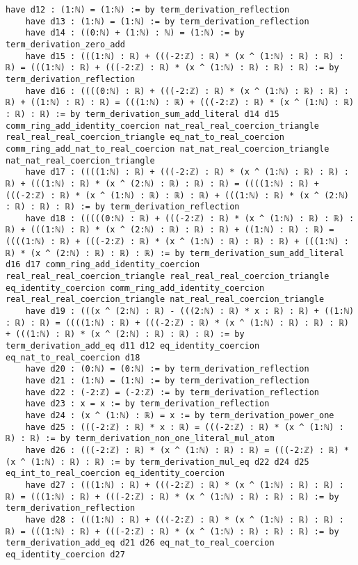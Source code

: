 \documentclass{article}
\begin{document}
\begin{tcolorbox}[colback=white!10, width=\linewidth]
\begin{lstlisting}[language=Lean4]
    have d12 : (1:ℕ) = (1:ℕ) := by term_derivation_reflection
    have d13 : (1:ℕ) = (1:ℕ) := by term_derivation_reflection
    have d14 : ((0:ℕ) + (1:ℕ) : ℕ) = (1:ℕ) := by term_derivation_zero_add
    have d15 : (((1:ℕ) : ℝ) + (((-2:ℤ) : ℝ) * (x ^ (1:ℕ) : ℝ) : ℝ) : ℝ) = (((1:ℕ) : ℝ) + (((-2:ℤ) : ℝ) * (x ^ (1:ℕ) : ℝ) : ℝ) : ℝ) := by term_derivation_reflection
    have d16 : ((((0:ℕ) : ℝ) + (((-2:ℤ) : ℝ) * (x ^ (1:ℕ) : ℝ) : ℝ) : ℝ) + ((1:ℕ) : ℝ) : ℝ) = (((1:ℕ) : ℝ) + (((-2:ℤ) : ℝ) * (x ^ (1:ℕ) : ℝ) : ℝ) : ℝ) := by term_derivation_sum_add_literal d14 d15 comm_ring_add_identity_coercion nat_real_real_coercion_triangle real_real_real_coercion_triangle eq_nat_to_real_coercion comm_ring_add_nat_to_real_coercion nat_nat_real_coercion_triangle nat_nat_real_coercion_triangle
    have d17 : ((((1:ℕ) : ℝ) + (((-2:ℤ) : ℝ) * (x ^ (1:ℕ) : ℝ) : ℝ) : ℝ) + (((1:ℕ) : ℝ) * (x ^ (2:ℕ) : ℝ) : ℝ) : ℝ) = ((((1:ℕ) : ℝ) + (((-2:ℤ) : ℝ) * (x ^ (1:ℕ) : ℝ) : ℝ) : ℝ) + (((1:ℕ) : ℝ) * (x ^ (2:ℕ) : ℝ) : ℝ) : ℝ) := by term_derivation_reflection
    have d18 : (((((0:ℕ) : ℝ) + (((-2:ℤ) : ℝ) * (x ^ (1:ℕ) : ℝ) : ℝ) : ℝ) + (((1:ℕ) : ℝ) * (x ^ (2:ℕ) : ℝ) : ℝ) : ℝ) + ((1:ℕ) : ℝ) : ℝ) = ((((1:ℕ) : ℝ) + (((-2:ℤ) : ℝ) * (x ^ (1:ℕ) : ℝ) : ℝ) : ℝ) + (((1:ℕ) : ℝ) * (x ^ (2:ℕ) : ℝ) : ℝ) : ℝ) := by term_derivation_sum_add_literal d16 d17 comm_ring_add_identity_coercion real_real_real_coercion_triangle real_real_real_coercion_triangle eq_identity_coercion comm_ring_add_identity_coercion real_real_real_coercion_triangle nat_real_real_coercion_triangle
    have d19 : (((x ^ (2:ℕ) : ℝ) - (((2:ℕ) : ℝ) * x : ℝ) : ℝ) + ((1:ℕ) : ℝ) : ℝ) = ((((1:ℕ) : ℝ) + (((-2:ℤ) : ℝ) * (x ^ (1:ℕ) : ℝ) : ℝ) : ℝ) + (((1:ℕ) : ℝ) * (x ^ (2:ℕ) : ℝ) : ℝ) : ℝ) := by term_derivation_add_eq d11 d12 eq_identity_coercion eq_nat_to_real_coercion d18
    have d20 : (0:ℕ) = (0:ℕ) := by term_derivation_reflection
    have d21 : (1:ℕ) = (1:ℕ) := by term_derivation_reflection
    have d22 : (-2:ℤ) = (-2:ℤ) := by term_derivation_reflection
    have d23 : x = x := by term_derivation_reflection
    have d24 : (x ^ (1:ℕ) : ℝ) = x := by term_derivation_power_one
    have d25 : (((-2:ℤ) : ℝ) * x : ℝ) = (((-2:ℤ) : ℝ) * (x ^ (1:ℕ) : ℝ) : ℝ) := by term_derivation_non_one_literal_mul_atom
    have d26 : (((-2:ℤ) : ℝ) * (x ^ (1:ℕ) : ℝ) : ℝ) = (((-2:ℤ) : ℝ) * (x ^ (1:ℕ) : ℝ) : ℝ) := by term_derivation_mul_eq d22 d24 d25 eq_int_to_real_coercion eq_identity_coercion
    have d27 : (((1:ℕ) : ℝ) + (((-2:ℤ) : ℝ) * (x ^ (1:ℕ) : ℝ) : ℝ) : ℝ) = (((1:ℕ) : ℝ) + (((-2:ℤ) : ℝ) * (x ^ (1:ℕ) : ℝ) : ℝ) : ℝ) := by term_derivation_reflection
    have d28 : (((1:ℕ) : ℝ) + (((-2:ℤ) : ℝ) * (x ^ (1:ℕ) : ℝ) : ℝ) : ℝ) = (((1:ℕ) : ℝ) + (((-2:ℤ) : ℝ) * (x ^ (1:ℕ) : ℝ) : ℝ) : ℝ) := by term_derivation_add_eq d21 d26 eq_nat_to_real_coercion eq_identity_coercion d27

\end{lstlisting}
\end{tcolorbox}
\end{document}
